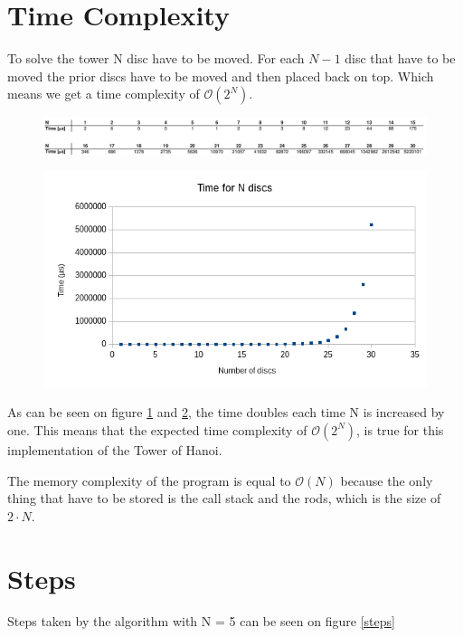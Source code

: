 \documentclass[a4paper,12pt,danish]{article}
\begin{document}
\section{Time Complexity}
To solve the tower N disc have to be moved. For each $N-1$ disc that have to be moved the prior discs have to be moved and then placed back on top. Which means we get a time complexity of $\mathcal{O}(2^N)$.

    \begin{figure}[H]     
    	\centering
    	\includegraphics[width=\textwidth]{Times.png}
    	\caption{}
    	\label{timeTable}
    \end{figure}
    
    \begin{figure}[H]     
    	\centering
    	\includegraphics[width=\textwidth]{Time.png}
    	\caption{}
    	\label{time}
    \end{figure}
		

As can be seen on figure \ref{timeTable} and \ref{time}, the time doubles each time N is increased by one. This means that the expected time complexity of  $\mathcal{O}(2^N)$, is true for this implementation of the Tower of Hanoi.

The memory complexity of the program is equal to  $\mathcal{O}(N)$ because the only thing that have to be stored is the call stack and the rods, which is the size of $2 \cdot N$.
\section{Steps}
Steps taken by the algorithm with N = 5 can be seen on figure \ref{steps}
\end{document}
